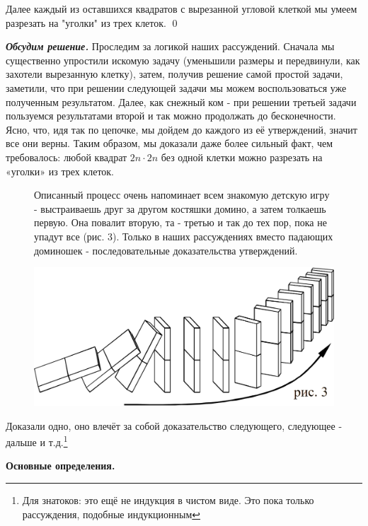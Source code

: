 Далее каждый из оставшихся квадратов с вырезанной угловой клеткой мы умеем разрезать на "уголки" из трех клеток. \qed

\textit{\textbf{Обсудим решение.}} Проследим за логикой наших рассуждений. Сначала мы существенно упростили искомую задачу (уменьшили размеры и передвинули, как захотели вырезанную клетку), затем, получив решение самой простой задачи, заметили, что при решении следующей задачи мы можем воспользоваться уже полученным результатом. Далее, как снежный ком - при решении третьей задачи пользуемся результатами второй и так можно продолжать до бесконечности. Ясно, что, идя так по цепочке, мы дойдем до каждого из её утверждений, значит все они верны. Таким образом, мы доказали даже более сильный факт, чем требовалось: любой квадрат $2n \cdot 2n$ без одной клетки можно разрезать на «уголки» из трех клеток.

{\setlength{\intextsep}{2pt}
\begin{figure}[h]
\begin{minipage}{0.45\linewidth}\setlength{\parindent}{1.5em}
Описанный процесс очень напоминает всем знакомую детскую игру - выстраиваешь друг за другом костяшки домино, а затем толкаешь первую. Она повалит вторую, та - третью и так до тех пор, пока не упадут все (рис. 3). Только в наших рассуждениях вместо падающих доминошек - последовательные доказательства утверждений. 
\end{minipage}
\hfill
\begin{minipage}{0.50\linewidth}
    \includegraphics[scale=0.32]{img/domino.png}
\end{minipage}
\end{figure}}
Доказали одно, оно влечёт за собой доказательство следующего, следующее - дальше и т.д.\footnote{Для знатоков: это ещё не индукция в чистом виде. Это пока только рассуждения, подобные индукционным}

\begin{center}
\textbf{Основные определения.}
\end{center}

